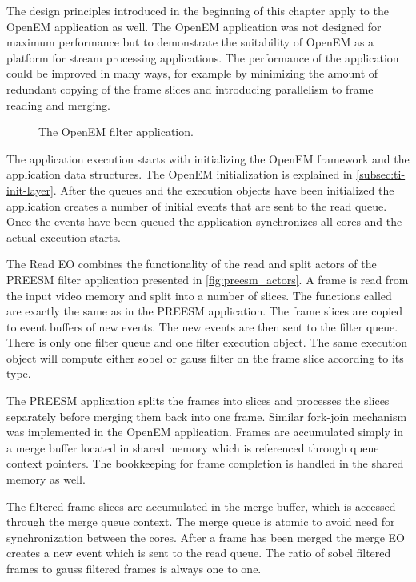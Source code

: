 The design principles introduced in the beginning of this chapter apply to the OpenEM application as well. The OpenEM application was not designed for maximum performance but to demonstrate the suitability of OpenEM as a platform for stream processing applications. The performance of the application could be improved in many ways, for example by minimizing the amount of redundant copying of the frame slices and introducing parallelism to frame reading and merging.  

\begin{figure}[h!]
    \begin{center}
        
        \caption{The OpenEM filter application.}
        \label{fig:openem_flow}
    \end{center}
\end{figure}

The application execution starts with initializing the OpenEM framework and the application data structures. The OpenEM initialization is explained in \ref{subsec:ti-init-layer}. After the queues and the execution objects have been initialized the application creates a number of initial events that are sent to the read queue. Once the events have been queued the application synchronizes all cores and the actual execution starts.

The Read EO combines the functionality of the read and split actors of the PREESM filter application presented in \ref{fig:preesm_actors}. A frame is read from the input video memory and split into a number of slices. The functions called are exactly the same as in the PREESM application. The frame slices are copied to event buffers of new events. The new events are then sent to the filter queue. There is only one filter queue and one filter execution object. The same execution object will compute either sobel or gauss filter on the frame slice according to its type.

The PREESM application splits the frames into slices and processes the slices separately before merging them back into one frame. Similar fork-join mechanism was implemented in the OpenEM application. Frames are accumulated simply in a merge buffer located in shared memory which is referenced through queue context pointers. The bookkeeping for frame completion is handled in the shared memory as well.

The filtered frame slices are accumulated in the merge buffer, which is accessed through the merge queue context. The merge queue is atomic to avoid need for synchronization between the cores. After a frame has been merged the merge EO creates a new event which is sent to the read queue. The ratio of sobel filtered frames to gauss filtered frames is always one to one.


